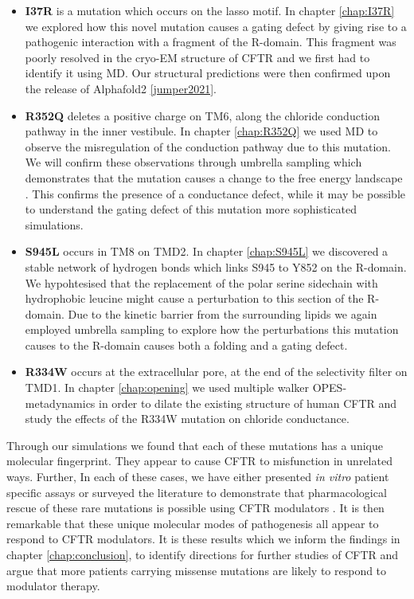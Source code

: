 \begin{itemize}
	\item \textbf{I37R} is a mutation which occurs on the lasso motif. In chapter \ref{chap:I37R} we explored how this novel mutation causes a gating defect by giving rise to a pathogenic interaction with a fragment of the R-domain. This fragment was poorly resolved in the cryo-EM structure of CFTR and we first had to identify it using MD. Our structural predictions were then confirmed upon the release of Alphafold2 \ref{jumper2021}.
	\item \textbf{R352Q} deletes a positive charge on TM6, along the chloride conduction pathway in the inner vestibule. In chapter \ref{chap:R352Q} we used MD to observe the misregulation of the conduction pathway due to this mutation. We will confirm these observations through umbrella sampling which demonstrates that the mutation causes a change to the free energy landscape . This confirms the presence of a conductance defect, while it may be possible to understand the gating defect of this mutation more sophisticated simulations.
	\item \textbf{S945L} occurs in TM8 on TMD2. In chapter \ref{chap:S945L} we discovered a stable network of hydrogen bonds which links S945 to Y852 on the R-domain. We hypohtesised that the replacement of the polar serine sidechain with hydrophobic leucine might cause a perturbation to this section of the R-domain. Due to the kinetic barrier from the surrounding lipids we again employed umbrella sampling to explore how the perturbations this mutation causes to the R-domain causes both a folding and a gating defect.   
	\item \textbf {R334W} occurs at the extracellular pore, at the end of the selectivity filter on TMD1. In chapter \ref{chap:opening} we used multiple walker OPES-metadynamics in order to dilate the existing structure of human CFTR and study the effects of the R334W mutation on chloride conductance.
\end{itemize}

Through our simulations we found that each of these mutations has a unique molecular fingerprint. They appear to cause CFTR to misfunction in unrelated ways. Further, In each of these cases, we have either presented \textit{in vitro} patient specific assays or surveyed the literature to demonstrate that pharmacological rescue of these rare mutations is possible using CFTR modulators \cite{R334W_Euro_CF_trial}.  It is then remarkable that these unique molecular modes of pathogenesis all appear to respond to CFTR modulators. It is these results which we inform the findings in chapter \ref{chap:conclusion}, to identify directions for further studies of CFTR and argue that more patients carrying missense mutations are likely to respond to modulator therapy.

